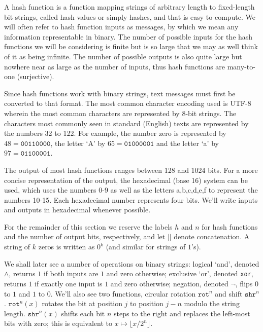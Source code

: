 \documentclass[a4paper,12pt]{article}
\begin{document}
A hash function is a function mapping strings of arbitrary length to fixed-length bit strings, called hash values or simply hashes, and that is easy to compute. We will often refer to hash function inputs as messages, by which we mean any information representable in binary. The number of possible inputs for the hash functions we will be considering is finite but is so large that we may as well think of it as being infinite. The number of possible outputs is also quite large but nowhere near as large as the number of inputs, thus hash functions are many-to-one (surjective).

Since hash functions work with binary strings, text messages must first be converted to that format. The most common character encoding used is UTF-8 wherein the most common characters are represented by 8-bit strings. The characters most commonly seen in standard (English) texts are represented by the numbers 32 to 122. For example, the number zero is represented by $48 = \texttt{00110000}$, the letter `A' by $65 = \texttt{01000001}$ and the letter `a' by $97 = \texttt{01100001}$.

The output of most hash functions ranges between 128 and 1024 bits. For a more concise representation of the output, the hexadecimal (base 16) system can be used, which uses the numbers 0-9 as well as the letters a,b,c,d,e,f to represent the numbers 10-15. Each hexadecimal number represents four bits. We'll write inputs and outputs in hexadecimal whenever possible. %

For the remainder of this section we reserve the labels $h$ and $n$ for hash functions and the number of output bits, respectively, and let $||$ denote concatenation. A string of $k$ zeros is written as $0^k$ (and similar for strings of $1$'s).

We shall later see a number of operations on binary strings: logical `and', denoted $\land$, returns $1$ if both inputs are $1$ and zero otherwise; exclusive `or', denoted \texttt{xor}, returns $1$ if exactly one input is $1$ and zero otherwise; negation, denoted $\neg$, flips $0$ to $1$ and $1$ to $0$. We'll also see two functions, circular rotation $\texttt{rot}^n$ and shift $\texttt{shr}^n$. $\texttt{rot}^n(x)$ rotates the bit at position $j$ to position $j-n$ modulo the string length. $\texttt{shr}^n(x)$ shifts each bit $n$ steps to the right and replaces the left-most bits with zero; this is equivalent to $x \mapsto \lfloor x/2^n \rfloor$.
\end{document}
